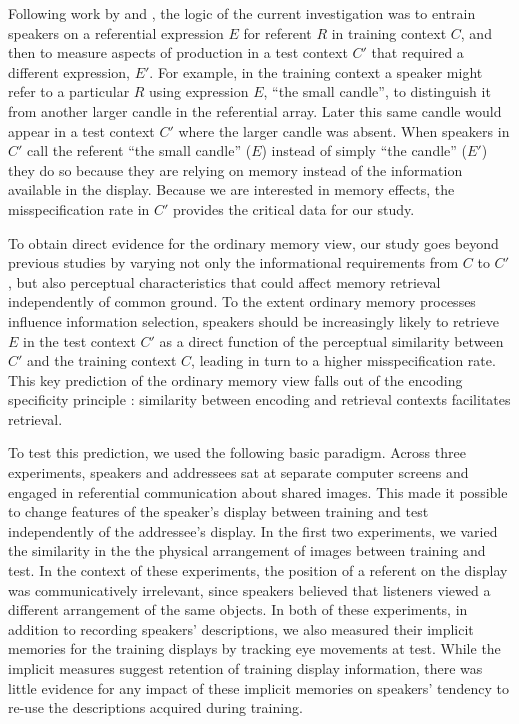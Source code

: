 \documentclass[natbib,doc,a4paper]{apa6}
\begin{document}
Following work by \cite{brennanclark96} and \cite{GannBarr2014}, the logic of the current investigation was to entrain speakers on a referential expression \(E\) for referent \(R\) in training context \(C\), and then to measure aspects of production in a test context \(C'\) that required a different expression, \(E'\). For example, in the training context a speaker might refer to a particular \(R\) using expression \(E\), ``the small candle'', to distinguish it from another larger candle in the referential array. Later this same candle would appear in a test context \(C'\) where the larger candle was absent.  When speakers in \(C'\) call the referent ``the small candle'' (\(E\)) instead of simply ``the candle'' (\(E'\)) they do so because they are relying on memory instead of the information available in the display. Because we are interested in memory effects, the misspecification rate in \(C'\) provides the critical data for our study.

To obtain direct evidence for the ordinary memory view, our study goes beyond previous studies by varying not only the informational requirements from \(C\) to \(C'\), but also perceptual characteristics that could affect memory retrieval independently of common ground. To the extent ordinary memory processes influence information selection, speakers should be increasingly likely to retrieve \(E\) in the test context \(C'\) as a direct function of the perceptual similarity between \(C'\) and the training context \(C\), leading in turn to a higher misspecification rate. This key prediction of the ordinary memory view falls out of the encoding specificity principle \citep{tulvingthomson73}: similarity between encoding and retrieval contexts facilitates retrieval. 

To test this prediction, we used the following basic paradigm. Across three experiments, speakers and addressees sat at separate computer screens and engaged in referential communication about shared images.  This made it possible to change features of the speaker's display between training and test independently of the addressee's display. In the first two experiments, we varied the similarity in the the physical arrangement of images between training and test.  In the context of these experiments, the position of a referent on the display was communicatively irrelevant, since speakers believed that listeners viewed a different arrangement of the same objects. In both of these experiments, in addition to recording speakers' descriptions, we also measured their implicit memories for the training displays by tracking eye movements at test. While the implicit measures suggest retention of training display information, there was little evidence for any impact of these implicit memories on speakers' tendency to re-use the descriptions acquired during training.
\end{document}
